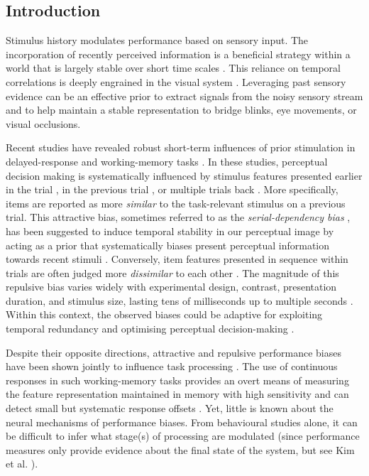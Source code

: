 \documentclass{article}
\begin{document}
\begin{large}
\section{Introduction}
Stimulus history modulates performance based on sensory input. The incorporation of recently perceived information is a beneficial strategy within a world that is largely stable over short time scales \parencite{Dong1995}. This reliance on temporal correlations is deeply engrained in the visual system \parencite{Simoncelli2001}. Leveraging past sensory evidence can be an effective prior to extract signals from the noisy sensory stream and to help maintain a stable representation to bridge blinks, eye movements, or visual occlusions. 


Recent studies have revealed robust short-term influences of prior stimulation in delayed-response and working-memory tasks \parencite{Bae2017, Czoschke2019, Czoschke2020, Fritsche2017, Cicchini2018, Cicchini2014, Fischer2014}. In these studies, perceptual decision making is systematically influenced by stimulus features presented earlier in the trial \parencite{Czoschke2019, Czoschke2020, Fritsche2017, Fritsche2019, Bae2017}, in the previous trial \parencite{Fritsche2017, Cicchini2017, Cicchini2018, Makovski2008}, or multiple trials back \parencite{Fritsche2020, Fritsche2021, Gekas2019, Suarez-Pinilla2018}. More specifically, items are reported as more \textit{similar} to the task-relevant stimulus on a previous trial. This attractive bias, sometimes referred to as the \textit{serial-dependency bias} \parencite{Fischer2014, Cicchini2014}, has been suggested to induce temporal stability in our perceptual image by acting as a prior that systematically biases present perceptual information towards recent stimuli \parencite{Fritsche2020, Kiyonaga2017}. Conversely, item features presented in sequence within trials are often judged more \textit{dissimilar} to each other \parencite{Born1992, Stormer2014, Fritsche2017}. The magnitude of this repulsive bias varies widely with experimental design, contrast, presentation duration, and stimulus size, lasting tens of milliseconds up to multiple seconds \parencite{Patterson2013, Priebe2002, Fritsche2021, Suarez-Pinilla2018, Fritsche2020}. Within this context, the observed biases could be adaptive for exploiting temporal redundancy and optimising perceptual decision-making \parencite{VanBergen2019, Cicchini2018, Kiyonaga2017}.

Despite their opposite directions, attractive and repulsive performance biases have been shown jointly to influence task processing \parencite{Czoschke2019, Fritsche2017, Fritsche2020, Sadil2021}. The use of continuous responses in such working-memory tasks provides an overt means of measuring the feature representation maintained in memory with high sensitivity and can detect small but systematic response offsets \parencite{Fisher2014, Huang2010}. Yet, little is known about the neural mechanisms of performance biases. From behavioural studies alone, it can be difficult to infer what stage(s) of processing are modulated (since performance measures only provide evidence about the final state of the system, but see Kim et al. \citeyear{Kim2020}). 


\end{large}
\end{document}
